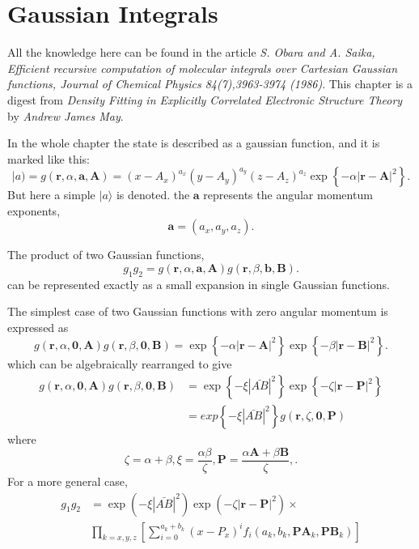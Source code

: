 \chapter{Gaussian Integrals}

All the knowledge here can be found in the article \emph{S. Obara and A. Saika, Efficient recursive computation of molecular integrals over Cartesian Gaussian functions, Journal of Chemical Physics 84(7),3963-3974 (1986)}. This chapter is a digest from \emph{Density Fitting in Explicitly Correlated Electronic Structure Theory} by \emph{Andrew James May}.

In the whole chapter the state is described as a gaussian function, and it is marked like this:
\begin{equation} 
	|a ) = g(\boldsymbol{r}, \alpha, \boldsymbol{a} ,\boldsymbol{A} ) = (x-A_x)^{a_x} (y-A_y)^{a_y} (z-A_z)^{a_z} \exp \left\{ - \alpha | \boldsymbol{r} - \boldsymbol{A} |^2  \right\}. 
\end{equation}  
But here a simple $| a \rangle $ is denoted. the  $\boldsymbol{a}$ represents the angular momentum exponents,
\[
	\boldsymbol{a} = (a_x,a_y,a_z)
.\] 

\begin{theorem}
	The product of two Gaussian functions,
	\[
		g_1 g_2 = g(\boldsymbol{r},\alpha, \boldsymbol{a},\boldsymbol{A}) g(\boldsymbol{r},\beta, \boldsymbol{b}, \boldsymbol{B})
	.\] 
	can be represented exactly as a small expansion in single Gaussian functions.
\end{theorem}
The simplest case of two Gaussian functions with zero angular momentum is expressed as 
	\[
		g(\boldsymbol{r},\alpha,\boldsymbol{0},\boldsymbol{A}) g(\boldsymbol{r},\beta, \boldsymbol{0}, \boldsymbol{B} ) = \exp\left\{ -\alpha | \boldsymbol{r}-\boldsymbol{A} | ^2 \right\} \exp \left\{ - \beta |\boldsymbol{r}- \boldsymbol{B}| ^2 \right\} 
	.\] 
	which can be algebraically rearranged to give
	\begin{align*}
		g(\boldsymbol{r},\alpha,\boldsymbol{0}, \boldsymbol{A}) g(\boldsymbol{r},\beta, \boldsymbol{0}, \boldsymbol{B}) &= \exp \left\{ - \xi |\bar{AB} |^2\right\}  \exp \left\{ - \zeta |\boldsymbol{r}-\boldsymbol{P}| ^2 \right\} \\
																&= exp \left\{ - \xi |\bar{AB}|^2 \right\} g(\boldsymbol{r},\zeta, \boldsymbol{0}, \boldsymbol{P})
	\end{align*}
	where
	\[
		\zeta = \alpha+ \beta, \xi = \frac{\alpha \beta}{\zeta}, \boldsymbol{P} = \frac{\alpha \boldsymbol{A} + \beta \boldsymbol{B}}{\zeta}, 
	.\] 
For a more general case,
\begin{align*}
	g_1 g_2 & = \exp \left( -\xi |\bar{AB} |^2  \right) \exp \left( -\zeta |\boldsymbol{r} - \boldsymbol{P} | ^2 \right) \times \\
		& \prod_{k=x,y,z}\left[ \sum_{i=0}^{a_k + b_k} (x-P_x)^i f_i(a_k, b_k, \boldsymbol{PA}_k,\boldsymbol{PB}_k)\right] 
\end{align*}


